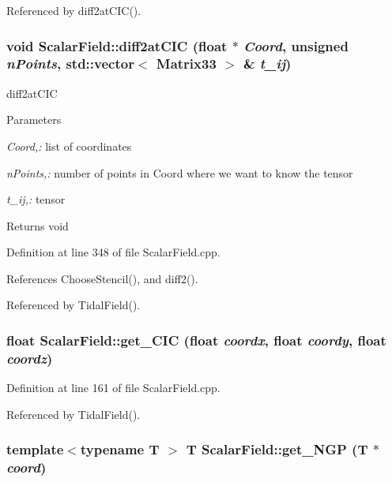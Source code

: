 Referenced by diff2atCIC().

\subsubsection[{diff2atCIC}]{\setlength{\rightskip}{0pt plus 5cm}void ScalarField::diff2atCIC (float $\ast$ {\em Coord}, \/  unsigned {\em nPoints}, \/  std::vector$<$ {\bf Matrix33} $>$ \& {\em t\_\-ij})}\label{classScalarField_a41ef09b33aace34a588bc8859fe498db}


diff2atCIC 


\begin{DoxyParams}{Parameters}
\item[{\em Coord,:}]list of coordinates \item[{\em nPoints,:}]number of points in Coord where we want to know the tensor \item[{\em t\_\-ij,:}]tensor \end{DoxyParams}
\begin{DoxyReturn}{Returns}
void 
\end{DoxyReturn}


Definition at line 348 of file ScalarField.cpp.



References ChooseStencil(), and diff2().



Referenced by TidalField().

\subsubsection[{get\_\-CIC}]{\setlength{\rightskip}{0pt plus 5cm}float ScalarField::get\_\-CIC (float {\em coordx}, \/  float {\em coordy}, \/  float {\em coordz})}\label{classScalarField_a0180095878f086b9c267460867b3ffa7}


Definition at line 161 of file ScalarField.cpp.



Referenced by TidalField().

\subsubsection[{get\_\-NGP}]{\setlength{\rightskip}{0pt plus 5cm}template$<$typename T $>$ T ScalarField::get\_\-NGP (T $\ast$ {\em coord})}\label{classScalarField_a1448da2d4923dea8da2b0c61f0fe21c7}



